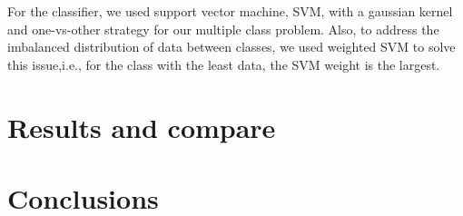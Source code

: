 \documentclass[conference]{IEEEtran}
\begin{document}
For the classifier, we used support vector machine, SVM, with a gaussian kernel and one-vs-other strategy for our multiple class problem. Also, to address the imbalanced distribution of data between classes, we used weighted SVM to solve this issue,i.e., for the class with the least data, the SVM weight is the largest.





\section{Results and compare}
\vspace{1cm}
\section{Conclusions}
\vspace{1cm}











\vspace{12pt}
\end{document}
